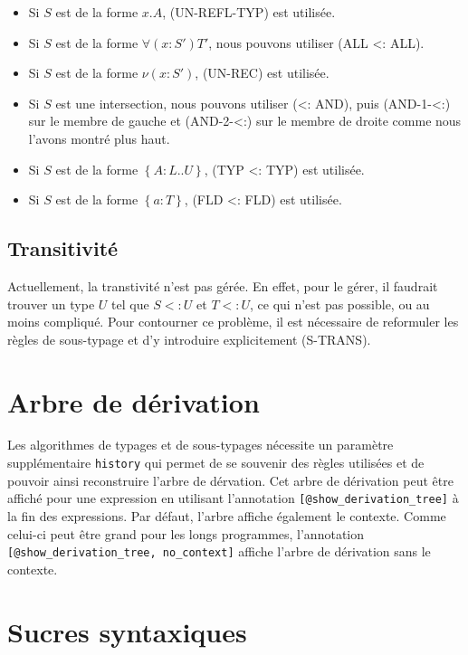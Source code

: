 \begin{itemize}
  \item Si $S$ est de la forme $x.A$, (UN-REFL-TYP) est utilisée.
  \item Si $S$ est de la forme $\forall(x : S') T'$, nous pouvons utiliser (ALL
    <: ALL).
  \item Si $S$ est de la forme $\nu(x : S')$, (UN-REC) est utilisée.
  \item Si $S$ est une intersection, nous pouvons utiliser (<: AND), puis
    (AND-1-<:) sur le membre de gauche et (AND-2-<:) sur le membre de droite
    comme nous l'avons montré plus haut.
  \item Si $S$ est de la forme $\left\{ A : L .. U \right\}$, (TYP <: TYP) est utilisée.
  \item Si $S$ est de la forme $\left\{ a : T \right\}$, (FLD <: FLD) est utilisée.
\end{itemize}

\subsection*{Transitivité}

Actuellement, la transtivité n'est pas gérée. En effet, pour le gérer, il
faudrait trouver un type $U$ tel que $S <: U$ et $T <: U$, ce qui n'est pas
possible, ou au moins compliqué. Pour contourner ce problème, il est
nécessaire de reformuler les règles de sous-typage et d'y introduire
explicitement (S-TRANS).

\section{Arbre de dérivation}

Les algorithmes de typages et de sous-typages nécessite un paramètre
supplémentaire \verb|history| qui permet de se souvenir des règles
utilisées et de pouvoir ainsi reconstruire l'arbre de dérvation. Cet arbre de
dérivation peut être affiché pour une expression en utilisant l'annotation
\verb|[@show_derivation_tree]| à la fin des expressions. Par défaut, l'arbre
affiche également le contexte. Comme celui-ci peut être grand pour les
longs programmes, l'annotation \\ \verb|[@show_derivation_tree, no_context]|
affiche l'arbre de dérivation sans le contexte.

\section{Sucres syntaxiques}


